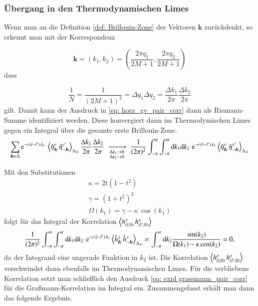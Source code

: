 \subsubsection{Übergang in den Thermodynamischen Limes}
Wenn man an die Definition \eqref{def: Brillouin-Zone} der Vektoren $\bm{k}$ zurückdenkt, so erkennt man mit der Korrespondenz 

\begin{equation} \label{eq: Korrespondez Integral_Summe Tlim 1}
\bm{k} = (k_1, k_2)  =  (\frac{2\pi q_1}{2M+1}, \frac{2\pi q_2}{2M+1}) 
\end{equation}
dass

\begin{equation} \label{eq: Korrespondez Integral_Summe Tlim 2}
\frac{1}{N} = \frac{1}{(2M+1)^2} = \Delta q_1 \Delta q_2 = \frac{\Delta k_1}{2\pi}\frac{\Delta k_2}{2\pi} 
\end{equation}
gilt. Damit kann der Ausdruck in \eqref{eq: horz_gv_pair_corr} dann als Riemann-Summe identifiziert werden. Diese konvergiert dann im Thermodymischen Limes gegen ein Integral über die gesamte erste Brillouin-Zone. 
\begin{equation} \nonumber
\sum_{\bm{k} \in \bar{\Lambda}}  \mathrm{e}^{-i\,(l-l') \,k_1} \,\left\langle \hat{\eta}_{\bm{k}}^{\nu}\, \hat{\eta}_{-\bm{k}}^{\nu'} \right\rangle_{\Lambda_N} \frac{\Delta k_1}{2\pi}\frac{\Delta k_2}{2\pi} \;\xrightarrow[\substack{\Delta k_1 \rightarrow 0 \\ \Delta k_2 \rightarrow 0 }]{}\; \frac{1}{(2\pi)^2}\int_{-\pi}^{\pi} \int_{-\pi}^{\pi} \mathrm{d} k_1 \mathrm{d} k_2 \,\,\mathrm{e}^{-i\, (l-l') \,k_1} \left\langle \hat{\eta}_{\bm{k}}^{\nu}\, \hat{\eta}_{-\bm{k}}^{\nu'} \right\rangle_{\Lambda_N} 
\end{equation} 

\noindent Mit den Substitutionen 
\begin{align}
\kappa = 2t(1-t^2) \label{subs: kappa}\\
\gamma = (1+t^2)^2 \label{subs: gamma}\\
\Omega(k_1) = \gamma - \kappa\, \cos(k_1) \label{subs: omega} 
\end{align}
\noindent folgt für das Integral der Korrelation $\left\langle h^{x}_{(l,0)}\, h^{x}_{(l', 0)}  \right\rangle$
\begin{equation} \nonumber
\frac{1}{(2\pi)^2}\int_{-\pi}^{\pi} \int_{-\pi}^{\pi} \mathrm{d} k_1 \mathrm{d} k_2 \,\,\mathrm{e}^{-i\,(l-l') \,k_1} \left\langle \hat{h}_{\bm{k}}^{x}\, \hat{h}_{-\bm{k}}^{x} \right\rangle_{\Lambda_N} \propto  \int_{-\pi}^{\pi} \mathrm{d} k_2 \frac{\sin(k_2)}{\Omega(k_1) - \kappa \cos(k_2)} = 0 ,
\end{equation}
da der Integrand eine ungerade Funktion in $k_2$ ist. Die Korrelation $\left\langle h^{o}_{(l,0)}\, h^{o}_{(l', 0)}  \right\rangle $ verschwindet dann ebenfalls im Thermodynamischen Limes. Für die verbliebene Korrelation setzt man schließlich den Ausdruck \eqref{eq: expl grassmann_pair_corr} für die Graßmann-Korrelation im Integral ein. Zusammengefasst erhält man dann das folgende Ergebnis.

